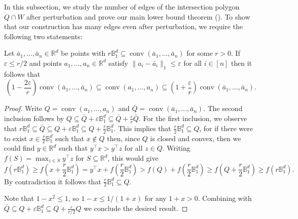 \documentclass{theoretics}
\newcommand{\R}{\mathbb R}
\newcommand{\T}{\top}
\newcommand{\eps}{\varepsilon} %
\newcommand{\conv}{\operatorname{conv}}
\newcommand{\edges}{\operatorname{edges}}
\renewcommand{\subset}{\subseteq}
\begin{document}
In this subsection, we study the number of edges of the intersection polygon $Q \cap W$ after perturbation and prove our main lower bound theorem (). 
To show that our construction has many edges even after perturbation,
we require the following two statements:
\begin{lemma}\label{lem:hdist}
Let $\bar a_1,\dots,\bar a_n \in \R^d$ be points with
$r \mathbb B ^d_1 \subseteq \conv(\bar a_1,\dots,\bar a_n)$ for some $r > 0$.
If $\eps \leq r/2$ and points $a_1,\dots, a_n \in \R^d$ satisfy $\|a_i - \bar a_i\|_1 \leq \eps$
for all $i \in [n]$ then it follows that
\[
(1-\frac{2 \eps}{r}) \conv(\bar a_1,\dots,\bar a_n) \subseteq \conv(a_1,\dots,a_n)
\subseteq (1+\frac{\eps}{r}) \conv(\bar a_1,\dots,\bar a_n).
\]
\end{lemma}
\begin{proof}
Write $Q = \conv(a_1,\dots,a_n)$ and $\bar Q = \conv(\bar a_1,\dots,\bar a_n)$.
The second inclusion follows by $Q \subseteq \bar Q + \eps \mathbb B_1^d \subseteq \bar Q + \frac{\eps}{r}\bar Q$.
For the first inclusion, we observe that
$r \mathbb B_1^d \subseteq \bar Q \subseteq Q + \eps \mathbb B_1^d \subseteq Q + \frac{r}{2} \mathbb B_1^d$.
This implies that $\frac r 2 \mathbb B_1^d \subseteq Q$, for
if there were to exist $x \in \frac r 2 \mathbb B^d_1$ such that $x \notin Q$ then,
since $Q$ is closed and convex, then we could find $y \in \R^d$ such that
$y^\T x > y^\T z$ for all $z \in Q$. Writing $f(S) = \max_{z \in S} y^\T z$
for $S \subseteq \R^d$, this would give
\[
f(r\mathbb B_1^d) \geq f(x + \frac r 2 \mathbb B_1^d)
= y^\T x + f(\frac r 2 \mathbb B_1^d)
> f(Q) + f(\frac r 2 \mathbb B_1^d)
\geq f(Q + \frac r 2 \mathbb B_1^d)
\geq f(r \mathbb B_1^d).
\]
By contradiction it follows that $\frac r 2 \mathbb B_1^d \subseteq Q$.

Note that $1-x^{2} \leq 1$, so $1-x \leq 1/(1+x)$ for any $1+x > 0$. Combining with $\bar Q \subseteq Q + \eps\mathbb B_1^d \subseteq Q + \frac{\eps}{r/2} Q$ we conclude the desired result.
\end{proof}
\end{document}
